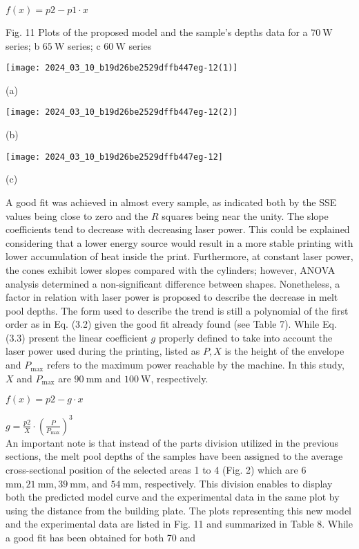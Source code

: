 \documentclass[10pt]{article}
\begin{document}
$f(x)=p 2-p 1 \cdot x$

Fig. 11 Plots of the proposed model and the sample's depths data for a $70 \mathrm{~W}$ series; b $65 \mathrm{~W}$ series; c $60 \mathrm{~W}$ series

\begin{center}
\texttt{[image: 2024\_03\_10\_b19d26be2529dffb447eg-12(1)]}
\end{center}

(a)

\begin{center}
\texttt{[image: 2024\_03\_10\_b19d26be2529dffb447eg-12(2)]}
\end{center}

(b)

\begin{center}
\texttt{[image: 2024\_03\_10\_b19d26be2529dffb447eg-12]}
\end{center}

(c)

A good fit was achieved in almost every sample, as indicated both by the SSE values being close to zero and the $R$ squares being near the unity. The slope coefficients tend to decrease with decreasing laser power. This could be explained considering that a lower energy source would result in a more stable printing with lower accumulation of heat inside the print. Furthermore, at constant laser power, the cones exhibit lower slopes compared with the cylinders; however, ANOVA analysis determined a non-significant difference between shapes. Nonetheless, a factor in relation with laser power is proposed to describe the decrease in melt pool depths. The form used to describe the trend is still a polynomial of the first order as in Eq. (3.2) given the good fit already found (see Table 7). While Eq. (3.3) present the linear coefficient $g$ properly defined to take into account the laser power used during the printing, listed as $P, X$ is the height of the envelope and $P_{\max }$ refers to the maximum power reachable by the machine. In this study, $X$ and $P_{\max }$ are $90 \mathrm{~mm}$ and $100 \mathrm{~W}$, respectively.

$f(x)=p 2-g \cdot x$

$g=\frac{p 2}{X} \cdot\left(\frac{P}{P_{\max }}\right)^{3}$\\
An important note is that instead of the parts division utilized in the previous sections, the melt pool depths of the samples have been assigned to the average cross-sectional position of the selected areas 1 to 4 (Fig. 2) which are 6 $\mathrm{mm}, 21 \mathrm{~mm}, 39 \mathrm{~mm}$, and $54 \mathrm{~mm}$, respectively. This division enables to display both the predicted model curve and the experimental data in the same plot by using the distance from the building plate. The plots representing this new model and the experimental data are listed in Fig. 11 and summarized in Table 8. While a good fit has been obtained for both 70 and
\end{document}
